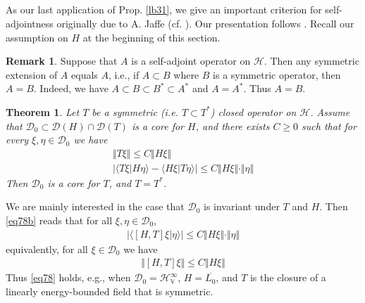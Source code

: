 \documentclass[12pt,b5paper,notitlepage]{article}
\theoremstyle{definition}
\newtheorem{rem}[df]{Remark}
\theoremstyle{plain}
\newtheorem{thm}[df]{Theorem}
\newcommand{\mc}{\mathcal}
\newcommand{\ovl}{\overline}
\newcommand{\Dom}{\scr{D}}
\newcommand{\bk}[1]{\langle {#1}\rangle}
\newcommand{\scr}{\mathscr}
\newcommand{\HV}{\mathcal H_{\mathbb V}}
\numberwithin{equation}{section}
\begin{document}
\subsection{}

As our last application of Prop. \ref{lb31}, we give an important criterion for self-adjointness originally due to A. Jaffe (cf. \cite[Thm. 19.4.3]{GJ}). Our presentation follows \cite{FL74}. Recall our assumption on $H$ at the beginning of this section.


\begin{rem}\label{lb60}
Suppose that $A$ is a self-adjoint operator on $\mc H$. Then any symmetric extension of $A$ equals $A$, i.e., if $A\subset B$ where $B$ is a symmetric operator, then $A=B$. Indeed, we have $A\subset B\subset B^*\subset A^*$ and $A=A^*$. Thus $A=B$.
\end{rem}


\begin{thm}\label{lb59}
Let $T$ be a symmetric (i.e. $T\subset T^*$) closed operator on $\mc H$. Assume that $\Dom_0\subset\Dom(H)\cap\Dom(T)$ is a core for $H$, and there exists $C\geq0$ such that for every $\xi,\eta\in\Dom_0$ we have
\begin{subequations}\label{eq78}
\begin{gather}
\Vert T\xi\Vert\leq C\Vert H\xi\Vert\label{eq78a}\\
\big|\bk{T\xi|H\eta}-\bk{H\xi|T\eta} \big|\leq C\Vert H\xi\Vert\cdot\Vert\eta\Vert  \label{eq78b}
\end{gather}
\end{subequations}
Then $\Dom_0$ is a core for $T$, and $T=T^*$.
\end{thm}

We are mainly interested in the case that $\Dom_0$ is invariant under $T$ and $H$. Then \eqref{eq78b} reads that for all $\xi,\eta\in\Dom_0$,
\begin{align*}
\big|\bk{[H,T]\xi|\eta}\big|\leq C\Vert H\xi\Vert\cdot\Vert\eta\Vert 
\end{align*}
equivalently, for all $\xi\in\Dom_0$ we have
\begin{align*}
\big\Vert [H,T]\xi\big\Vert\leq C\Vert H\xi\Vert
\end{align*}
Thus \eqref{eq78} holds, e.g., when $\Dom_0=\HV^\infty$, $H=\ovl{L_0}$, and $T$ is the closure of a linearly energy-bounded field that is symmetric.
\end{document}
